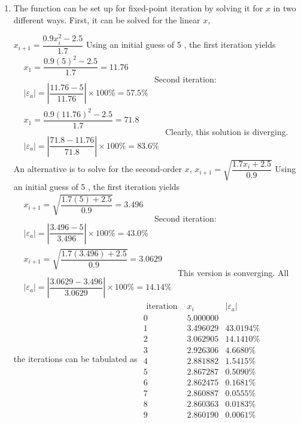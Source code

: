 \documentclass[../main.tex]{subfiles}
\begin{document}
\section{}
\begin{enumerate}[label=\bfseries(\alph*)]
\item The function can be set up for fixed-point iteration by solving it for $x$ in two different ways. First, it can be solved for the linear $x$,



\bigbreak
$x_{i+1}=\dfrac{0.9 x_{i}^{2}-2.5}{1.7}$
\bigbreak
Using an initial guess of 5 , the first iteration yields
\bigbreak
$
\begin{aligned}
&x_{1}=\dfrac{0.9(5)^{2}-2.5}{1.7}=11.76 \\\\
&\left|\varepsilon_{a}\right|=\left|\dfrac{11.76-5}{11.76}\right| \times 100 \%=57.5 \%
\end{aligned}
$
\bigbreak
Second iteration:
\bigbreak
$
\begin{aligned}
&x_{1}=\dfrac{0.9(11.76)^{2}-2.5}{1.7}=71.8 \\\\
&\left|\varepsilon_{a}\right|=\left|\dfrac{71.8-11.76}{71.8}\right| \times 100 \%=83.6 \%
\end{aligned}
$
\bigbreak
Clearly, this solution is diverging.
\bigbreak
An alternative is to solve for the second-order $x$,
\bigbreak
$x_{i+1}=\sqrt{\dfrac{1.7 x_{i}+2.5}{0.9}}$
\bigbreak
Using an initial guess of 5 , the first iteration yields
\bigbreak
$
\begin{aligned}
&x_{i+1}=\sqrt{\dfrac{1.7(5)+2.5}{0.9}}=3.496 \\\\
&\left|\varepsilon_{a}\right|=\left|\dfrac{3.496-5}{3.496}\right| \times 100 \%=43.0 \%
\end{aligned}
$
\bigbreak
Second iteration:
\bigbreak
$
\begin{aligned}
&x_{i+1}=\sqrt{\dfrac{1.7(3.496)+2.5}{0.9}}=3.0629 \\\\
&\left|\varepsilon_{a}\right|=\left|\dfrac{3.0629-3.496}{3.0629}\right| \times 100 \%=14.14 \%
\end{aligned}
$
\bigbreak
This version is converging. All the iterations can be tabulated as
\bigbreak
$\begin{array}{ccc}\text { iteration } & x_{i} & \left|\varepsilon_{a}\right| \\ 0 & 5.000000 & \\ 1 & 3.496029 & 43.0194 \% \\ 2 & 3.062905 & 14.1410 \% \\ 3 & 2.926306 & 4.6680 \% \\ 4 & 2.881882 & 1.5415 \% \\ 5 & 2.867287 & 0.5090 \%\\ 6 & 2.862475 & 0.1681 \% \\ 7 & 2.860887 & 0.0555 \% \\ 8 & 2.860363 & 0.0183 \% \\ 9 & 2.860190 & 0.0061 \%\end{array}$

\end{enumerate}
\end{document}
